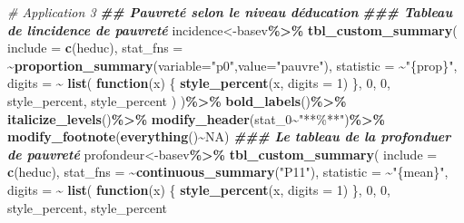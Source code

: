 \documentclass[
]{article}
\newenvironment{Shaded}{\begin{snugshade}}{\end{snugshade}}
\newcommand{\AttributeTok}[1]{\textcolor[rgb]{0.13,0.29,0.53}{#1}}
\newcommand{\CommentTok}[1]{\textcolor[rgb]{0.56,0.35,0.01}{\textit{#1}}}
\newcommand{\ConstantTok}[1]{\textcolor[rgb]{0.56,0.35,0.01}{#1}}
\newcommand{\ControlFlowTok}[1]{\textcolor[rgb]{0.13,0.29,0.53}{\textbf{#1}}}
\newcommand{\DecValTok}[1]{\textcolor[rgb]{0.00,0.00,0.81}{#1}}
\newcommand{\DocumentationTok}[1]{\textcolor[rgb]{0.56,0.35,0.01}{\textbf{\textit{#1}}}}
\newcommand{\FunctionTok}[1]{\textcolor[rgb]{0.13,0.29,0.53}{\textbf{#1}}}
\newcommand{\NormalTok}[1]{#1}
\newcommand{\OtherTok}[1]{\textcolor[rgb]{0.56,0.35,0.01}{#1}}
\newcommand{\SpecialCharTok}[1]{\textcolor[rgb]{0.81,0.36,0.00}{\textbf{#1}}}
\newcommand{\StringTok}[1]{\textcolor[rgb]{0.31,0.60,0.02}{#1}}
\begin{document}
\begin{Shaded}
\begin{Highlighting}[]
\CommentTok{\# Application 3}
\DocumentationTok{\#\# Pauvreté selon le niveau d\textquotesingle{}éducation}
\DocumentationTok{\#\#\# Tableau de l\textquotesingle{}incidence de pauvreté}
\NormalTok{incidence}\OtherTok{\textless{}{-}}\NormalTok{basev}\SpecialCharTok{\%\textgreater{}\%}
  \FunctionTok{tbl\_custom\_summary}\NormalTok{(}
  \AttributeTok{include =} \FunctionTok{c}\NormalTok{(heduc),}
  \AttributeTok{stat\_fns =} \SpecialCharTok{\textasciitilde{}}\FunctionTok{proportion\_summary}\NormalTok{(}\AttributeTok{variable=}\StringTok{"p0"}\NormalTok{,}\AttributeTok{value=}\StringTok{"pauvre"}\NormalTok{),}
  \AttributeTok{statistic =} \SpecialCharTok{\textasciitilde{}}\StringTok{"\{prop\}"}\NormalTok{,}
  \AttributeTok{digits =} \SpecialCharTok{\textasciitilde{}} \FunctionTok{list}\NormalTok{(}
      \ControlFlowTok{function}\NormalTok{(x) \{}
        \FunctionTok{style\_percent}\NormalTok{(x, }\AttributeTok{digits =} \DecValTok{1}\NormalTok{)}
\NormalTok{      \},}
      \DecValTok{0}\NormalTok{, }\DecValTok{0}\NormalTok{, style\_percent, style\_percent}
\NormalTok{    )}
\NormalTok{)}\SpecialCharTok{\%\textgreater{}\%}
  \FunctionTok{bold\_labels}\NormalTok{()}\SpecialCharTok{\%\textgreater{}\%} 
  \FunctionTok{italicize\_levels}\NormalTok{()}\SpecialCharTok{\%\textgreater{}\%} 
  \FunctionTok{modify\_header}\NormalTok{(stat\_0}\SpecialCharTok{\textasciitilde{}}\StringTok{"**\%**"}\NormalTok{)}\SpecialCharTok{\%\textgreater{}\%}
  \FunctionTok{modify\_footnote}\NormalTok{(}\FunctionTok{everything}\NormalTok{()}\SpecialCharTok{\textasciitilde{}}\ConstantTok{NA}\NormalTok{)}
\DocumentationTok{\#\#\# Le tableau de la profonduer de pauvreté}
\NormalTok{profondeur}\OtherTok{\textless{}{-}}\NormalTok{basev}\SpecialCharTok{\%\textgreater{}\%}
  \FunctionTok{tbl\_custom\_summary}\NormalTok{(}
  \AttributeTok{include =} \FunctionTok{c}\NormalTok{(heduc),}
  \AttributeTok{stat\_fns =} \SpecialCharTok{\textasciitilde{}}\FunctionTok{continuous\_summary}\NormalTok{(}\StringTok{"P11"}\NormalTok{),}
  \AttributeTok{statistic =} \SpecialCharTok{\textasciitilde{}}\StringTok{"\{mean\}"}\NormalTok{,}
  \AttributeTok{digits =} \SpecialCharTok{\textasciitilde{}} \FunctionTok{list}\NormalTok{(}
      \ControlFlowTok{function}\NormalTok{(x) \{}
        \FunctionTok{style\_percent}\NormalTok{(x, }\AttributeTok{digits =} \DecValTok{1}\NormalTok{)}
\NormalTok{      \},}
      \DecValTok{0}\NormalTok{, }\DecValTok{0}\NormalTok{, style\_percent, style\_percent}

\end{Highlighting}
\end{Shaded}
\end{document}
